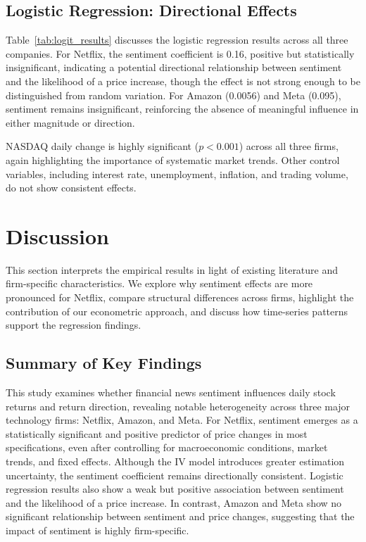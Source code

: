 \documentclass[12pt]{article}
\begin{document}
\subsection{Logistic Regression: Directional Effects
}

Table~\ref{tab:logit_results} discusses the logistic regression results across all three companies.  For Netflix, the sentiment coefficient is 0.16, positive but statistically insignificant, indicating a potential directional relationship between sentiment and the likelihood of a price increase, though the effect is not strong enough to be distinguished from random variation. For Amazon (0.0056) and Meta (0.095), sentiment remains insignificant, reinforcing the absence of meaningful influence in either magnitude or direction.

NASDAQ daily change is highly significant ($p < 0.001$) across all three firms, again highlighting the importance of systematic market trends. Other control variables, including interest rate, unemployment, inflation, and trading volume, do not show consistent effects.


\section{Discussion}
\label{sec:discussion}
This section interprets the empirical results in light of existing literature and firm-specific characteristics. We explore why sentiment effects are more pronounced for Netflix, compare structural differences across firms, highlight the contribution of our econometric approach, and discuss how time-series patterns support the regression findings. 
\subsection{ Summary of Key Findings}
This study examines whether financial news sentiment influences daily stock returns and return direction, revealing notable heterogeneity across three major technology firms: Netflix, Amazon, and Meta. For Netflix, sentiment emerges as a statistically significant and positive predictor of price changes in most specifications, even after controlling for macroeconomic conditions, market trends, and fixed effects. Although the IV model introduces greater estimation uncertainty, the sentiment coefficient remains directionally consistent. Logistic regression results also show a weak but positive association between sentiment and the likelihood of a price increase. In contrast, Amazon and Meta show no significant relationship between sentiment and price changes, suggesting that the impact of sentiment is highly firm-specific.
\end{document}
